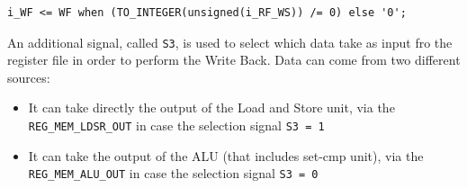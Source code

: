 \hfill
\begin{lstlisting}[style=vhdl,caption={VHDL code gating the WS signal coming from the CU}]
	i_WF <= WF when (TO_INTEGER(unsigned(i_RF_WS)) /= 0) else '0';
\end{lstlisting}
\hfill

An additional signal, called \texttt{S3}, is used to select which data take as input fro the register file in order to perform the Write Back. Data can come from two different sources:
\begin{itemize}
	\itemsep0sp
	\item It can take directly the output of the Load and Store unit, via the \texttt{REG\_MEM\_LDSR\_OUT} in case the selection signal \texttt{S3 = 1}
	\item It can take the output of the ALU (that includes set-cmp unit), via the \texttt{REG\_MEM\_ALU\_OUT} in case the selection signal \texttt{S3 = 0}
\end{itemize}
